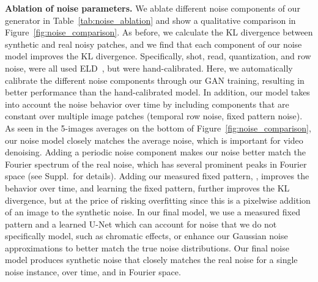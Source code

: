 \documentclass[final]{cvpr}
\begin{document}
\begin{comment}
\begin{table}[thb]
    \centering
    \newcolumntype{Z}{S[table-format=1.3,table-auto-round]}
	\begin{tabularx}{\linewidth}{X@{\hspace{5mm}}Z}
    \toprule
    Noise Model      & {KLD} \\  
    \midrule
ELD~\cite{wei2020physics}      & 1.3607 \\
    Noise Flow~\cite{abdelhamed2019noise}       & 0.3855 \\ 
    CA-GAN model~\cite{chang2020learning}       & 0.5130 \\
    \midrule
    Ours & \textbf{0.0691}\\
    \bottomrule
    \end{tabularx}
    \caption{We compare our noise generator to prior work, representative of different approaches to modeling noise distributions. Our method significantly outperforms all baselines. See Figure~\ref{fig:noise_comparison} for a visual comparison.}
    \label{tab:noise_prior}
    \vspace{-8mm}
\end{table}
\end{comment}




\vspace{1mm}\noindent\textbf{Ablation of noise parameters.}
We ablate different noise components of our generator in Table~\ref{tab:noise_ablation} and show a qualitative comparison in Figure~\ref{fig:noise_comparison}. As before, we calculate the KL divergence between synthetic and real noisy patches, and we find that each component of our noise model improves the KL divergence. Specifically, shot, read, quantization, and row noise, were all used ELD~\cite{wei2020physics}, but were hand-calibrated. Here, we automatically calibrate the different noise components through our GAN training, resulting in better performance than the hand-calibrated model. In addition, our model takes into account the noise behavior over time by including components that are constant over multiple image patches (temporal row noise, fixed pattern noise). As seen in the 5-images averages on the bottom of Figure~\ref{fig:noise_comparison}, our noise model closely matches the average noise, which is important for video denoising. Adding a periodic noise component makes our noise better match the Fourier spectrum of the real noise, which has several prominent peaks in Fourier space (see Suppl.\ for details).  Adding our measured fixed pattern, , improves the behavior over time, and learning the fixed pattern,  further improves the KL divergence, but at the price of risking overfitting since this is a pixelwise addition of an image to the synthetic noise. In our final model, we use a measured fixed pattern and a learned U-Net which can account for noise that we do not specifically model, such as chromatic effects, or enhance our Gaussian noise approximations to better match the true noise distributions. Our final noise model produces synthetic noise that closely matches the real noise for a single noise instance, over time, and in Fourier space. 
\end{document}
